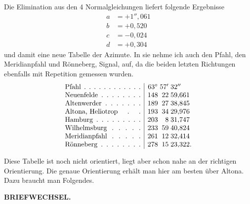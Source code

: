 Die Elimination aus den 4 Normalgleichungen liefert folgende Ergebnisse
\[
\begin{aligned}
 a&=+1''{,}061\\
 b&=+0{,}520\\
 c&=-0{,}024\\
 d&=+0{,}304
\end{aligned}
\]
und damit eine neue Tabelle der Azimute. In sie nehme ich auch den Pfahl, den Meridianpfahl und Rönneberg, Signal, auf, da die beiden letzten Richtungen ebenfalls mit Repetition gemessen wurden.
\[
\begin{array}{@{}l|r@{\;}r@{\;}l@{}}
 \text{\hbox to 11em{Pfahl\hfil.\hfil.\hfil.\hfil.\hfil.\hfil.\hfil.\hfil.\hfil.\hfil.\hfil.\hfil.}}&63^\circ&57'&32''\\
 \text{\hbox to 11em{Neuenfelde\hfil.\hfil.\hfil.\hfil.\hfil.\hfil.\hfil.\hfil.}}&148&22&59{,}661\\
 \text{\hbox to 11em{Altenwerder\hfil.\hfil.\hfil.\hfil.\hfil.\hfil.\hfil.}}&189&27&38{,}845\\
 \text{\hbox to 11em{Altona, Heliotrop\hfil.\hfil.}}&193&34&29{,}976\\
 \text{\hbox to 11em{Hamburg\hfil.\hfil.\hfil.\hfil.\hfil.\hfil.\hfil.\hfil.\hfil.}}&203&8&31{,}747\\
 \text{\hbox to 11em{Wilhelmsburg\hfil.\hfil.\hfil.\hfil.\hfil.}}&233&59&40{,}824\\
 \text{\hbox to 11em{Meridianpfahl\hfil.\hfil.\hfil.\hfil.\hfil.}}&261&12&32{,}414\\
 \text{\hbox to 11em{Rönneberg\hfil.\hfil.\hfil.\hfil.\hfil.\hfil.\hfil.\hfil.}}&278&15&23{,}322.
\end{array}
\]

Diese Tabelle ist noch nicht orientiert, liegt aber schon nahe an der richtigen Orientierung. Die genaue Orientierung erhält man hier am besten über Altona. Dazu braucht man Folgendes.

\par\clearpage
\noindent{}\hfill{\small\textbf{BRIEFWECHSEL.}}\hfill\null\par\medskip

